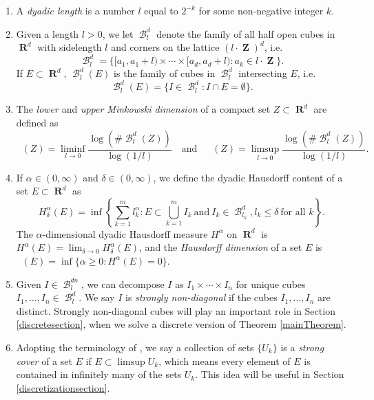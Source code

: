 \documentclass[dvipsnames,letterpaper,12pt]{article}
\numberwithin{equation}{section}
\theoremstyle{plain}
\theoremstyle{remark}
\DeclareMathOperator{\hausdim}{\dim_{\mathbf{H}}}
\DeclareMathOperator{\lowminkdim}{\underline{\dim}_{\mathbf{M}}}
\DeclareMathOperator{\upminkdim}{\overline{\dim}_{\mathbf{M}}}
\DeclareMathOperator{\RR}{\mathbf{R}}
\DeclareMathOperator{\ZZ}{\mathbf{Z}}
\DeclareMathOperator{\B}{\mathcal{B}}
\begin{document}
\begin{enumerate}
	\item\label{defDyadicLength} A {\it dyadic length} is a number $l$ equal to $2^{-k}$ for some non-negative integer $k$.

	\item\label{defDyadicGrid} Given a length $l > 0$, we let $\B^d_l$ denote the family of all half open cubes in $\RR^d$ with sidelength $l$ and corners on the lattice $(l \cdot \ZZ)^d$, i.e.
	\[ \B^d_l = \{ [a_1, a_1 + l) \times \cdots \times [a_d, a_d+l) : a_k \in l \cdot \ZZ \}. \]
	If $E \subset \RR^d$, $\B^d_l(E)$ is the family of cubes in $\B^d_l$ intersecting $E$, i.e.
	\[ \B^d_l(E) = \{ I \in \B^d_l: I \cap E = \emptyset \}. \]

	\item\label{defMinkowskiDim} The {\it lower} and {\it upper Minkowski dimension} of a compact set $Z \subset \RR^d$ are defined as
	\[ \lowminkdim(Z) = \liminf_{l \to 0} \frac{\log(\# \B^d_l(Z))}{\log(1/l)}\quad \text{and}\quad \upminkdim(Z) = \limsup_{l \to 0} \frac{\log(\# \B^d_l(Z))}{\log(1/l)}. \]

	\item\label{defHausdorffDim} If $\alpha \in (0,\infty)$ and $\delta \in (0,\infty)$, we define the dyadic Hausdorff content of a set $E\subset\RR^d$ as 
	\[ H^\alpha_\delta(E) = \inf \left\{ \sum_{k = 1}^m l_k^\alpha : E \subset \bigcup_{k = 1}^m I_k\ \text{and}\ I_k \in \B^d_{l_k}, l_k \leq \delta\ \text{for all $k$} \right\}. \]
	The $\alpha$-dimensional dyadic Hausdorff measure $H^\alpha$ on $\RR^d$ is $H^\alpha(E) = \lim_{\delta \to 0} H_\delta^\alpha(E)$, and the {\it Hausdorff dimension} of a set $E$ is $\hausdim(E) = \inf \{ \alpha \geq 0 : H^\alpha(E) = 0 \}$.

	\item\label{defStronglyNonDiagonal} Given $I \in \B^{dn}_l$, we can decompose $I$ as $I_1 \times \cdots \times I_n$ for unique cubes $I_1, \dots, I_n \in \B_l^d$. We say $I$ is {\it strongly non-diagonal} if the cubes $I_1, \dots, I_n$ are distinct. Strongly non-diagonal cubes will play an important role in Section \ref{discretesection}, when we solve a discrete version of Theorem \ref{mainTheorem}.

	\item\label{defStrongCover} Adopting the terminology of \cite{KatzTao}, we say a collection of sets $\{ U_k \}$ is a {\it strong cover} of a set $E$ if $E \subset \limsup U_k$, which means every element of $E$ is contained in infinitely many of the sets $U_k$. This idea will be useful in Section \ref{discretizationsection}.  


\end{enumerate}
\end{document}
